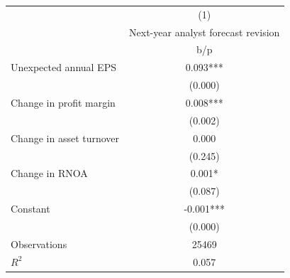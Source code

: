 {
\def\sym#1{\ifmmode^{#1}\else\(^{#1}\)\fi}
\begin{tabular}{l*{1}{c}}
\hline\hline
                    &\multicolumn{1}{c}{(1)}\\
                    &\multicolumn{1}{c}{Next-year analyst forecast revision}\\
                    &         b/p   \\
\hline
Unexpected annual EPS&       0.093***\\
                    &     (0.000)   \\
Change in profit margin&       0.008***\\
                    &     (0.002)   \\
Change in asset turnover&       0.000   \\
                    &     (0.245)   \\
Change in RNOA      &       0.001*  \\
                    &     (0.087)   \\
Constant            &      -0.001***\\
                    &     (0.000)   \\
\hline
Observations        &       25469   \\
\(R^{2}\)           &       0.057   \\
\hline\hline
\end{tabular}
}
